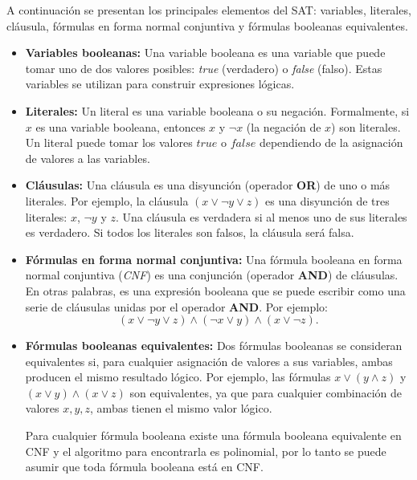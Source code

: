 \documentclass[12pt]{article}
\begin{document}
A continuación se presentan los principales elementos del SAT: variables, literales, cláusula, fórmulas en forma normal conjuntiva y fórmulas booleanas equivalentes.

\begin{itemize}
  \item \textbf{Variables booleanas:}
        Una variable booleana es una variable que puede tomar uno de dos valores posibles: \textit{true} (verdadero) o \textit{false} (falso). Estas variables se utilizan para construir expresiones lógicas.
  \item \textbf{Literales:}
        Un literal es una variable booleana o su negación. Formalmente, si \( x \) es una variable booleana, entonces \( x \) y \( \neg x \) (la negación de \( x \)) son literales. Un literal puede tomar los valores \( true \) o \( false \) dependiendo de la asignación de valores a las variables.
  \item  \textbf{Cláusulas:}
        Una cláusula es una disyunción (operador \textbf{OR}) de uno o más literales. Por ejemplo, la cláusula \( (x \vee \neg y \vee z) \) es una disyunción de tres literales: \( x \), \( \neg y \) y \( z \). Una cláusula es verdadera si al menos uno de sus literales es verdadero. Si todos los literales son falsos, la cláusula será falsa.
  \item \textbf{Fórmulas en forma normal conjuntiva:}
        Una fórmula booleana en forma normal conjuntiva (\textit{CNF}) es una conjunción (operador \textbf{AND}) de cláusulas. En otras palabras, es una expresión booleana que se puede escribir como una serie de cláusulas unidas por el operador \textbf{AND}. Por ejemplo:        
        \[
          (x \vee \neg y \vee z) \wedge (\neg x \vee y) \wedge (x \vee \neg z).
        \]
  \item \textbf{Fórmulas booleanas equivalentes:}
        Dos fórmulas booleanas se consideran equivalentes si, para cualquier asignación de valores a sus variables, ambas producen el mismo resultado lógico. Por ejemplo, las fórmulas \( x \vee (y \wedge z) \) y \( (x \vee y) \wedge (x \vee z) \) son equivalentes, ya que para cualquier combinación de valores \( x, y, z \), ambas tienen el mismo valor lógico.
        
        Para cualquier fórmula booleana existe una fórmula booleana equivalente en CNF \cite{authomataTheory} y 
        el algoritmo para encontrarla es polinomial, por lo tanto se puede asumir que toda fórmula booleana está en CNF.
        
\end{itemize}
\end{document}
